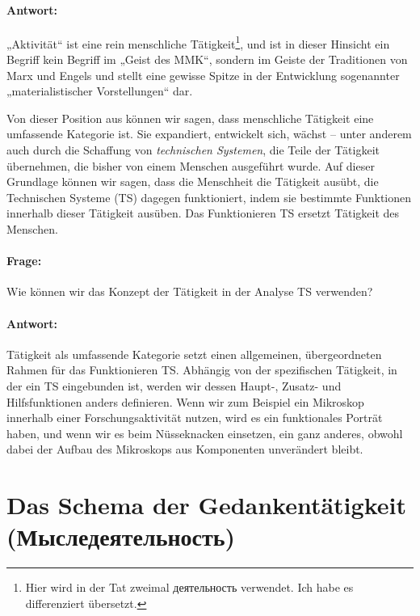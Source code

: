 \documentclass[11pt,a4paper]{article}
\begin{document}
\paragraph{Antwort:}
„Aktivität“ ist eine rein menschliche Tätigkeit\footnote{Hier wird in der Tat
  zweimal \foreignlanguage{russian}{деятельность} verwendet. Ich habe es
  differenziert übersetzt.}, und ist in dieser Hinsicht ein Begriff kein
Begriff im „Geist des MMK“, sondern im Geiste der Traditionen von Marx und
Engels und stellt eine gewisse Spitze in der Entwicklung sogenannter
„materialistischer Vorstellungen“ dar.

Von dieser Position aus können wir sagen, dass menschliche Tätigkeit eine
umfassende Kategorie ist. Sie expandiert, entwickelt sich, wächst -- unter
anderem auch durch die Schaffung von \emph{technischen Systemen}, die Teile
der Tätigkeit übernehmen, die bisher von einem Menschen ausgeführt wurde. Auf
dieser Grundlage können wir sagen, dass die Menschheit die Tätigkeit ausübt,
die Technischen Systeme (TS) dagegen funktioniert, indem sie bestimmte
Funktionen innerhalb dieser Tätigkeit ausüben.  Das Funktionieren TS ersetzt
Tätigkeit des Menschen.

\paragraph{Frage:}
Wie können wir das Konzept der Tätigkeit in der Analyse TS verwenden?

\paragraph{Antwort:}
Tätigkeit als umfassende Kategorie setzt einen allgemeinen, übergeordneten
Rahmen für das Funktionieren TS. Abhängig von der spezifischen Tätigkeit, in
der ein TS eingebunden ist, werden wir dessen Haupt-, Zusatz- und
Hilfsfunktionen anders definieren. Wenn wir zum Beispiel ein Mikroskop
innerhalb einer Forschungsaktivität nutzen, wird es ein funktionales Porträt
haben, und wenn wir es beim Nüsseknacken einsetzen, ein ganz anderes, obwohl
dabei der Aufbau des Mikroskops aus Komponenten unverändert bleibt.

\section{Das Schema der Gedankentätigkeit
  (\foreignlanguage{russian}{Мыследеятельность})}
\end{document}
